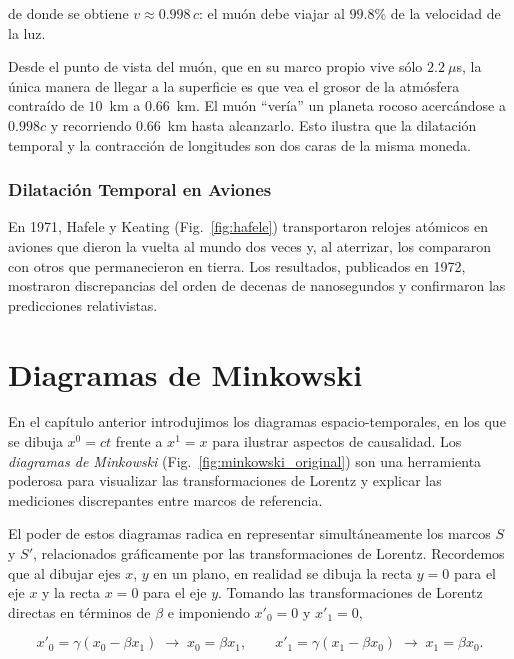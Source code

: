 de donde se obtiene $v \approx 0.998\,c$: el muón debe viajar al $99.8\%$ de la velocidad de la luz.

Desde el punto de vista del muón, que en su marco propio vive sólo $2.2~\mu$s, la única manera de llegar a la superficie es que vea el grosor de la atmósfera contraído de $10$~km a $0.66$~km. El muón ``vería'' un planeta rocoso acercándose a $0.998c$ y recorriendo $0.66$~km hasta alcanzarlo. Esto ilustra que la dilatación temporal y la contracción de longitudes son dos caras de la misma moneda.

\subsubsection{Dilatación Temporal en Aviones}

En 1971, Hafele y Keating (Fig.~\ref{fig:hafele}) transportaron relojes atómicos en aviones que dieron la vuelta al mundo dos veces y, al aterrizar, los compararon con otros que permanecieron en tierra. Los resultados, publicados en 1972, mostraron discrepancias del orden de decenas de nanosegundos y confirmaron las predicciones relativistas.



\section{Diagramas de Minkowski}

En el capítulo anterior introdujimos los diagramas espacio-temporales, en los que se dibuja $x^0=ct$ frente a $x^1=x$ para ilustrar aspectos de causalidad. Los \emph{diagramas de Minkowski} (Fig.~\ref{fig:minkowski_original}) son una herramienta poderosa para visualizar las transformaciones de Lorentz y explicar las mediciones discrepantes entre marcos de referencia.



El poder de estos diagramas radica en representar simultáneamente los marcos $S$ y $S'$, relacionados gráficamente por las transformaciones de Lorentz. Recordemos que al dibujar ejes $x$, $y$ en un plano, en realidad se dibuja la recta $y=0$ para el eje $x$ y la recta $x=0$ para el eje $y$. Tomando las transformaciones de Lorentz directas en términos de $\beta$ e imponiendo $x'_0=0$ y $x'_1=0$,

$$
x'_0 = \gamma(x_0 - \beta x_1) \;\longrightarrow\; x_0 = \beta x_1 , \qquad
x'_1 = \gamma(x_1 - \beta x_0) \;\longrightarrow\; x_1 = \beta x_0 .
$$

